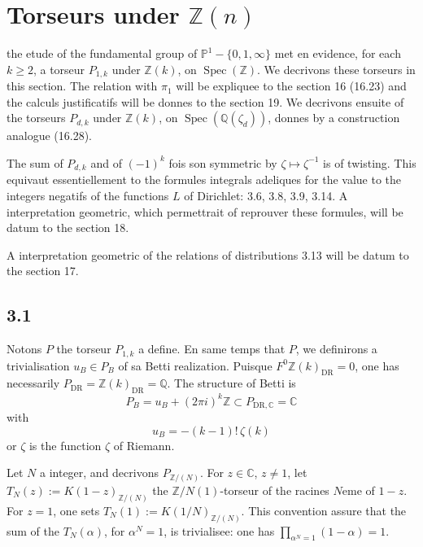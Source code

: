 \documentclass[12pt,a4paper]{article}
\theoremstyle{plain}
\theoremstyle{definition}
\theoremstyle{remark}
\DeclareMathOperator{\Spec}{Spec}
\providecommand{\Spec}{\operatorname{Spec}}
\providecommand{\DR}{\mathrm{DR}}
\begin{document}
\section{Torseurs under $\mathbb{Z}(n)$}\label{sec:3}

the etude of the fundamental group of $\mathbb{P}^1 - \{0, 1, \infty\}$ met en evidence,
for each $k \geq 2$, a torseur $P_{1,k}$ under $\mathbb{Z}(k)$, on
$\Spec(\mathbb{Z})$. We decrivons these torseurs in this section. The relation with
$\pi_1$ will be expliquee to the section 16 (16.23) and the calculs justificatifs will be
donnes to the section 19. We decrivons ensuite of the torseurs $P_{d,k}$ under
$\mathbb{Z}(k)$, on $\Spec(\mathbb{Q}(\zeta_d))$, donnes by a construction analogue
(16.28).

The sum of $P_{d,k}$ and of $(-1)^k$ fois son symmetric by $\zeta \mapsto \zeta^{-1}$
is of twisting. This equivaut essentiellement to the formules integrals adeliques
for the value to the integers negatifs of the functions $L$ of Dirichlet: 3.6, 3.8, 3.9,
3.14. A interpretation geometric, which permettrait of reprouver these formules,
will be datum to the section 18.

A interpretation geometric of the relations of distributions 3.13 will be datum
to the section 17.

\subsection*{3.1}

Notons $P$ the torseur $P_{1,k}$ a define. En same temps that $P$, we
definirons a trivialisation $u_B \in P_B$ of sa Betti realization. Puisque
$F^0 \mathbb{Z}(k)_{\DR} = 0$, one has necessarily $P_{\DR} = \mathbb{Z}(k)_{\DR} =
\mathbb{Q}$. The structure of Betti is
\begin{equation}\label{eq:3.1.1}
P_B = u_B + (2\pi i)^k \mathbb{Z} \subset P_{\DR,\mathbb{C}} = \mathbb{C}
\end{equation}
with
\begin{equation*}
u_B = -(k-1)!\, \zeta(k)
\end{equation*}
or $\zeta$ is the function $\zeta$ of Riemann.

Let $N$ a integer, and decrivons $P_{\mathbb{Z}/(N)}$. For $z \in \mathbb{C}$,
$z \neq 1$, let $T_N(z) := K(1-z)_{\mathbb{Z}/(N)}$ the $\mathbb{Z}/N(1)$-torseur of the
racines $N$eme of $1-z$. For $z = 1$, one sets $T_N(1) :=
K(1/N)_{\mathbb{Z}/(N)}$. This convention assure that the sum of the $T_N(\alpha)$, for
$\alpha^N = 1$, is trivialisee: one has $\prod_{\alpha^N=1} (1-\alpha) = 1$.
\end{document}
